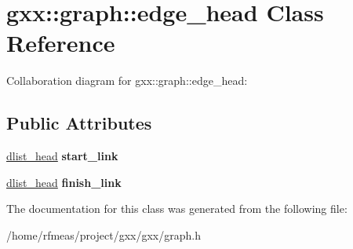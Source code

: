 \hypertarget{classgxx_1_1graph_1_1edge__head}{}\section{gxx\+:\+:graph\+:\+:edge\+\_\+head Class Reference}
\label{classgxx_1_1graph_1_1edge__head}


Collaboration diagram for gxx\+:\+:graph\+:\+:edge\+\_\+head\+:
\subsection*{Public Attributes}
\begin{DoxyCompactItemize}
\item 
\hyperlink{structdlist__head}{dlist\+\_\+head} {\bfseries start\+\_\+link}\hypertarget{classgxx_1_1graph_1_1edge__head_a201be15b2997c01c14cd40a006cc353c}{}\label{classgxx_1_1graph_1_1edge__head_a201be15b2997c01c14cd40a006cc353c}

\item 
\hyperlink{structdlist__head}{dlist\+\_\+head} {\bfseries finish\+\_\+link}\hypertarget{classgxx_1_1graph_1_1edge__head_a087721890a817066b6bc781a4a693da3}{}\label{classgxx_1_1graph_1_1edge__head_a087721890a817066b6bc781a4a693da3}

\end{DoxyCompactItemize}


The documentation for this class was generated from the following file\+:\begin{DoxyCompactItemize}
\item 
/home/rfmeas/project/gxx/gxx/graph.\+h\end{DoxyCompactItemize}
